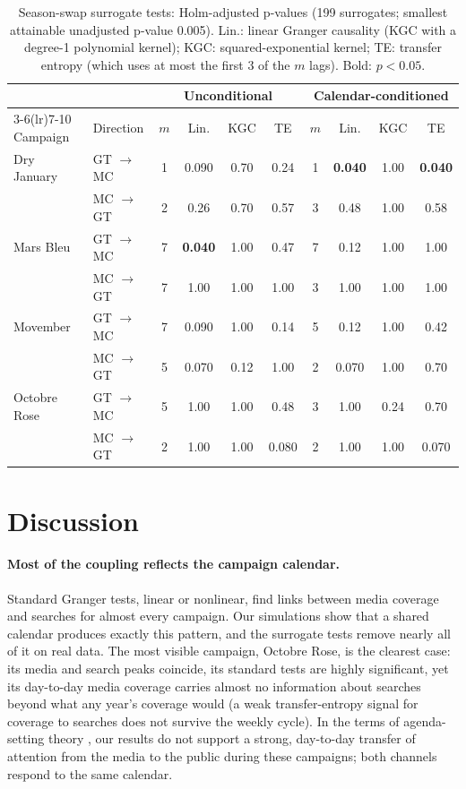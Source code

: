 \documentclass[11pt,a4paper]{article}
\begin{document}
\begin{table}[htbp]
\centering
\caption{Season-swap surrogate tests: Holm-adjusted p-values (199 surrogates; smallest attainable unadjusted p-value 0.005). Lin.: linear Granger causality (KGC with a degree-1 polynomial kernel); KGC: squared-exponential kernel; TE: transfer entropy (which uses at most the first 3 of the $m$ lags). Bold: $p<0.05$.}
\label{tab:surrogates}
\small
\begin{tabular}{llcccccccc}
\toprule
 & & \multicolumn{4}{c}{Unconditional} & \multicolumn{4}{c}{Calendar-conditioned} \\
\cmidrule(lr){3-6}\cmidrule(lr){7-10}
Campaign & Direction & $m$ & Lin. & KGC & TE & $m$ & Lin. & KGC & TE \\
\midrule
Dry January & GT $\to$ MC & 1 & 0.090 & 0.70 & 0.24 & 1 & \textbf{0.040} & 1.00 & \textbf{0.040} \\
 & MC $\to$ GT & 2 & 0.26 & 0.70 & 0.57 & 3 & 0.48 & 1.00 & 0.58 \\
Mars Bleu & GT $\to$ MC & 7 & \textbf{0.040} & 1.00 & 0.47 & 7 & 0.12 & 1.00 & 1.00 \\
 & MC $\to$ GT & 7 & 1.00 & 1.00 & 1.00 & 3 & 1.00 & 1.00 & 1.00 \\
Movember & GT $\to$ MC & 7 & 0.090 & 1.00 & 0.14 & 5 & 0.12 & 1.00 & 0.42 \\
 & MC $\to$ GT & 5 & 0.070 & 0.12 & 1.00 & 2 & 0.070 & 1.00 & 0.70 \\
Octobre Rose & GT $\to$ MC & 5 & 1.00 & 1.00 & 0.48 & 3 & 1.00 & 0.24 & 0.70 \\
 & MC $\to$ GT & 2 & 1.00 & 1.00 & 0.080 & 2 & 1.00 & 1.00 & 0.070 \\
\bottomrule
\end{tabular}
\end{table}

\section{Discussion}
\paragraph{Most of the coupling reflects the campaign calendar.} Standard Granger tests, linear or nonlinear, find links between media coverage and searches for almost every campaign. Our simulations show that a shared calendar produces exactly this pattern, and the surrogate tests remove nearly all of it on real data. The most visible campaign, Octobre Rose, is the clearest case: its media and search peaks coincide, its standard tests are highly significant, yet its day-to-day media coverage carries almost no information about searches beyond what any year's coverage would (a weak transfer-entropy signal for coverage to searches does not survive the weekly cycle). In the terms of agenda-setting theory \cite{mccombs1972}, our results do not support a strong, day-to-day transfer of attention from the media to the public during these campaigns; both channels respond to the same calendar.
\end{document}
